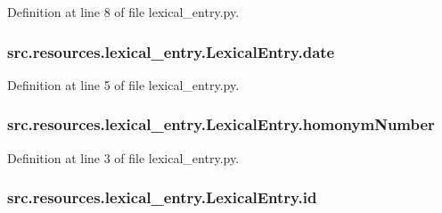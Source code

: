 Definition at line 8 of file lexical\+\_\+entry.\+py.

\hypertarget{classsrc_1_1resources_1_1lexical__entry_1_1_lexical_entry_a5b2b53f127e66404beaf084ff19e258d}{
\subsubsection[{date}]{\setlength{\rightskip}{0pt plus 5cm}src.\+resources.\+lexical\+\_\+entry.\+Lexical\+Entry.\+date}}\label{classsrc_1_1resources_1_1lexical__entry_1_1_lexical_entry_a5b2b53f127e66404beaf084ff19e258d}


Definition at line 5 of file lexical\+\_\+entry.\+py.

\hypertarget{classsrc_1_1resources_1_1lexical__entry_1_1_lexical_entry_a96d489c77c1762c5d99258b33a5188d7}{
\subsubsection[{homonym\+Number}]{\setlength{\rightskip}{0pt plus 5cm}src.\+resources.\+lexical\+\_\+entry.\+Lexical\+Entry.\+homonym\+Number}}\label{classsrc_1_1resources_1_1lexical__entry_1_1_lexical_entry_a96d489c77c1762c5d99258b33a5188d7}


Definition at line 3 of file lexical\+\_\+entry.\+py.

\hypertarget{classsrc_1_1resources_1_1lexical__entry_1_1_lexical_entry_a82f37d6c2d9c65a0272a0a671b64eddc}{
\subsubsection[{id}]{\setlength{\rightskip}{0pt plus 5cm}src.\+resources.\+lexical\+\_\+entry.\+Lexical\+Entry.\+id}}\label{classsrc_1_1resources_1_1lexical__entry_1_1_lexical_entry_a82f37d6c2d9c65a0272a0a671b64eddc}


